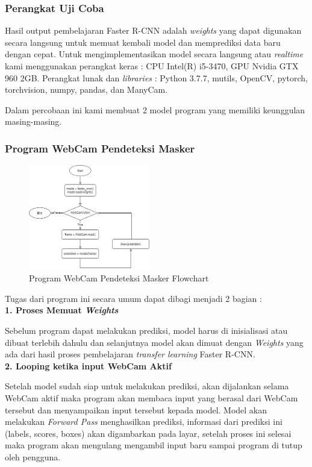 \documentclass{article}
\begin{document}
  	\subsubsection{Perangkat Uji Coba}
	\par Hasil output pembelajaran Faster R-CNN adalah \textit{weights} yang dapat digunakan secara langsung untuk memuat kembali model dan memprediksi data baru dengan cepat. Untuk mengimplementasikan model secara langsung atau \textit{realtime} kami menggunakan perangkat keras : CPU Intel(R) i5-3470, GPU Nvidia GTX 960 2GB. Perangkat lunak dan \textit{libraries} : Python 3.7.7, mutils, OpenCV, pytorch, torchvision, numpy, pandas, dan ManyCam. 
	
	\par Dalam percobaan ini kami membuat 2 model program yang memiliki keunggulan masing-masing.
	\subsubsection{Program WebCam Pendeteksi Masker}
	\begin{figure}[H]
  		\centering
  		\includegraphics[width=200px]{arsitektur/Sequential Model.png}
  		\caption{Program WebCam Pendeteksi Masker Flowchart}
	\end{figure}
	Tugas dari program ini secara umum dapat dibagi menjadi 2 bagian : \\
	{\textbf{1. Proses Memuat \textit{Weights}}}
	\par Sebelum program dapat melakukan prediksi, model harus di inisialisasi atau dibuat terlebih dahulu dan selanjutnya model akan dimuat dengan \textit{Weights} yang ada dari hasil proses pembelajaran \textit{transfer learning} Faster R-CNN.\\
	{\textbf{2. Looping ketika input WebCam Aktif}}
	\par Setelah model sudah siap untuk melakukan prediksi, akan dijalankan selama WebCam aktif maka program akan membaca input yang berasal dari WebCam tersebut dan menyampaikan input tersebut kepada model. Model akan melakukan \textit{Forward Pass} menghasilkan prediksi, informasi dari prediksi ini (labels, scores, boxes) akan digambarkan pada layar, setelah proses ini selesai maka program akan mengulang mengambil input baru sampai program di tutup oleh pengguna.\\
\end{document}
